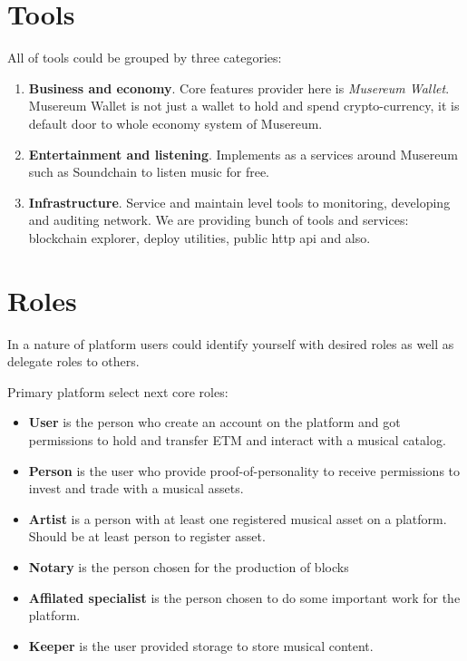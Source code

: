 \documentclass[12pt]{report}
\begin{document}
\section{Tools}
\begin{multicols}{2}
All of tools could be grouped by three categories:
\begin{enumerate}
	\item \textbf{Business and economy}. Core features provider here is \textit{Musereum Wallet}. Musereum Wallet is not just a wallet to hold and spend crypto-currency, it is default door to whole economy system of Musereum. 
	\item \textbf{Entertainment and listening}. Implements as a services around Musereum such as Soundchain to listen music for free.
	\item \textbf{Infrastructure}. Service and maintain level tools to monitoring, developing and auditing network. We are providing bunch of tools and services: blockchain explorer, deploy utilities, public http api and also.
\end{enumerate}
\end{multicols}

\section{Roles}
\label{platform-roles}
In a nature of platform users could identify yourself with desired roles as well as delegate roles to others.

Primary platform select next core roles:
\begin{itemize}
	\item \textbf{User} is the person who create an account on the platform and got permissions to hold and transfer ETM and interact with a musical catalog.
	\item \textbf{Person} is the user who provide proof-of-personality to receive permissions to invest and trade with a musical assets.
	\item \textbf{Artist} is a person with at least one registered musical asset on a platform. Should be at least person to register asset.
	\item \textbf{Notary} is the person chosen for the production of blocks
	\item \textbf{Affilated specialist} is the person chosen to do some important work for the platform. 
	\item \textbf{Keeper} is the user provided storage to store musical content.
\end{itemize}
\end{document}
